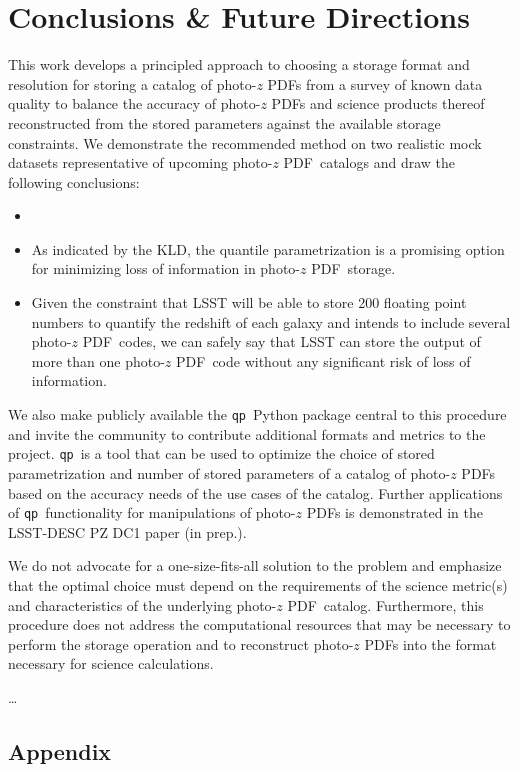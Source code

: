 \documentclass[\docopts]{\docclass}
\newcommand{\qp}{\texttt{qp}}
\newcommand{\pz}{photo-$z$ PDF}
\begin{document}
\section{Conclusions \& Future Directions}
\label{sec:conclusions}


This work develops a principled approach to choosing a storage format and 
resolution for storing a catalog of \pz s from a survey of known data quality 
to balance the accuracy of \pz s and science products thereof reconstructed 
from the stored parameters against the available storage constraints.  We 
demonstrate the recommended method on two realistic mock datasets 
representative of upcoming \pz\ catalogs and draw the following conclusions:
\begin{itemize}
  \item
  \item As indicated by the KLD, the quantile parametrization is a promising 
option for minimizing loss of information in \pz\ storage.
  \item Given the constraint that LSST will be able to store 200 floating point 
numbers to quantify the redshift of each galaxy and intends to include several 
\pz\ codes, we can safely say that LSST can store the output of more than one 
\pz\ code without any significant risk of loss of information.
\end{itemize}

We also make publicly available the \qp\ Python package central to this 
procedure and invite the community to contribute additional formats and metrics 
to the project.  \qp\ is a tool that can be used to optimize the choice of 
stored parametrization and number of stored parameters of a catalog of \pz s 
based on the accuracy needs of the use cases of the catalog.  Further 
applications of \qp\ functionality for manipulations of \pz s is demonstrated 
in the LSST-DESC PZ DC1 paper (in prep.).

We do not advocate for a one-size-fits-all solution to the problem and 
emphasize that the optimal choice must depend on the requirements of the 
science metric(s) and characteristics of the underlying \pz\ catalog.  
Furthermore, this procedure does not address the computational resources that 
may be necessary to perform the storage operation and to reconstruct \pz s into 
the format necessary for science calculations.

\dots


\subsection*{Appendix}
\label{sec:kld}
\end{document}
